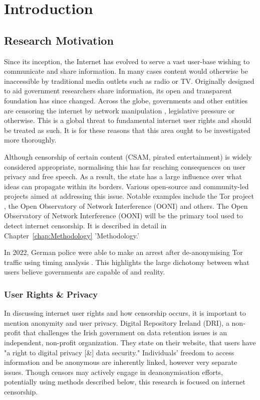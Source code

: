 \chapter{Introduction}

\section{Research Motivation}

Since its inception, the Internet has evolved to serve a vast user-base wishing to communicate and share information. In many cases content would otherwise be inaccessible by traditional media outlets such as radio or TV. Originally designed to aid government researchers share information, its open and transparent foundation has since changed. Across the globe, governments and other entities are censoring the internet by network manipulation \cite{ooni2024yearinreview}, legislative pressure \cite{EUCopyright} or otherwise. This is a global threat to fundamental internet user rights \cite{digital_rights_ireland} and should be treated as such. It is for these reasons that this area ought to be investigated more thoroughly.

Although censorship of certain content (CSAM, pirated entertainment) is widely considered appropriate, normalising this has far reaching consequences on user privacy and free speech. As a result, the state has a large influence over what ideas can propagate within its borders. Various open-source and community-led projects aimed at addressing this issue. Notable examples include the Tor project \cite{dingledine2004tor}, the Open Observatory of Network Interference (OONI) \cite{ooniAbout} and others. The Open Observatory of Network Interference (OONI) will be the primary tool used to detect internet censorship. It is described in detail in Chapter~\ref{chap:Methodology} 'Methodology.'

In 2022, German police were able to make an arrest after de-anonymising Tor traffic using timing analysis \cite{TorDeanonymization}. This highlights the large dichotomy between what users believe governments are capable of and reality. 

\subsection{User Rights \& Privacy}
In discussing internet user rights and how censorship occurs, it is important to mention anonymity and user privacy. Digital Repository Ireland (DRI), a non-profit that challenges the Irish government on data retention issues is an independent, non-profit organization. They state on their website, that users have "a right to digital privacy [\&] data security." \cite{digital_rights_ireland} Individuals' freedom to access information and be anonymous are inherently linked, however very separate issues. Though censors may actively engage in deanonymisation efforts, potentially using methods described below, this research is focused on internet censorship.


